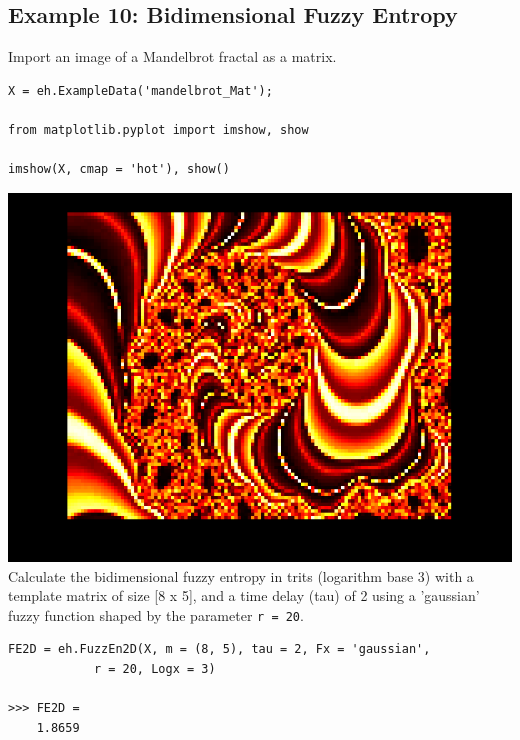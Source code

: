 \documentclass[12pt, a4paper, titlepage, openany]{book}
\begin{document}
\subsection{\normalsize Example 10: \hspace{15mm} Bidimensional Fuzzy Entropy}
\noindent Import an image of a Mandelbrot fractal as a matrix.
\begin{verbatim}
X = eh.ExampleData('mandelbrot_Mat');

from matplotlib.pyplot import imshow, show

imshow(X, cmap = 'hot'), show()
\end{verbatim}
\includegraphics[scale=.4]{mandelbrot.png}\newline \newline
Calculate the bidimensional fuzzy entropy in trits (logarithm base 3) with a template matrix of size [8 x 5], and a time delay (tau) of 2  using a 'gaussian' fuzzy function shaped by the parameter \texttt{r = 20}.
\begin{verbatim}
FE2D = eh.FuzzEn2D(X, m = (8, 5), tau = 2, Fx = 'gaussian',
			r = 20, Logx = 3)

>>> FE2D = 
	1.8659
\end{verbatim}



\newpage
\end{document}

